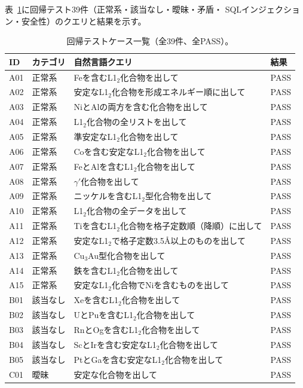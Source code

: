 \documentclass[5p,twocolumn]{elsarticle}
\begin{document}
表~\ref{tab:sup_all_tests}に回帰テスト39件（正常系・該当なし・曖昧・矛盾・
SQLインジェクション・安全性）のクエリと結果を示す。

\begin{table}[htbp]
\centering
\caption{回帰テストケース一覧（全39件、全PASS）。}
\label{tab:sup_all_tests}
\footnotesize
\begin{tabular}{llp{8cm}l}
  \toprule
  ID & カテゴリ & 自然言語クエリ & 結果 \\
  \midrule
  A01 & 正常系 & Feを含むL1$_2$化合物を出して & PASS \\
  A02 & 正常系 & 安定なL1$_2$化合物を形成エネルギー順に出して & PASS \\
  A03 & 正常系 & NiとAlの両方を含む化合物を出して & PASS \\
  A04 & 正常系 & L1$_2$化合物の全リストを出して & PASS \\
  A05 & 正常系 & 準安定なL1$_2$化合物を出して & PASS \\
  A06 & 正常系 & Coを含む安定なL1$_2$化合物を出して & PASS \\
  A07 & 正常系 & FeとAlを含むL1$_2$化合物を出して & PASS \\
  A08 & 正常系 & $\gamma'$化合物を出して & PASS \\
  A09 & 正常系 & ニッケルを含むL1$_2$型化合物を出して & PASS \\
  A10 & 正常系 & L1$_2$化合物の全データを出して & PASS \\
  A11 & 正常系 & Tiを含むL1$_2$化合物を格子定数順（降順）に出して & PASS \\
  A12 & 正常系 & 安定なL1$_2$で格子定数3.5\AA 以上のものを出して & PASS \\
  A13 & 正常系 & Cu$_3$Au型化合物を出して & PASS \\
  A14 & 正常系 & 鉄を含むL1$_2$化合物を出して & PASS \\
  A15 & 正常系 & 安定なL1$_2$化合物でNiを含むものを出して & PASS \\
  \midrule
  B01 & 該当なし & Xeを含むL1$_2$化合物を出して & PASS \\
  B02 & 該当なし & UとPuを含むL1$_2$化合物を出して & PASS \\
  B03 & 該当なし & RnとOgを含むL1$_2$化合物を出して & PASS \\
  B04 & 該当なし & ScとIrを含む安定なL1$_2$化合物を出して & PASS \\
  B05 & 該当なし & PtとGaを含む安定なL1$_2$化合物を出して & PASS \\
  \midrule
  C01 & 曖昧 & 安定な化合物を出して & PASS \\

\end{tabular}
\end{table}
\end{document}
